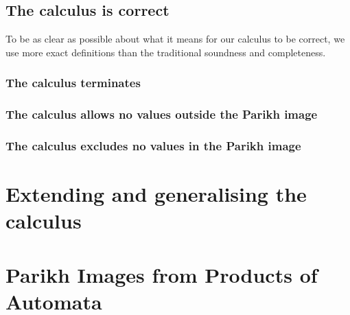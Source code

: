 \documentclass[acmsmall,review,anonymous]{acmart}\settopmatter{printfolios=true,printccs=false,printacmref=true}
\theoremstyle{definition}
\newtheorem{definition}{Definition}[section]
\begin{document}
\subsection{The calculus is correct}

To be as clear as possible about what it means for our calculus to be correct,
we use more exact definitions than the traditional soundness and completeness.

\subsubsection{The calculus terminates}
\subsubsection{The calculus allows no values outside the Parikh image}
\subsubsection{The calculus excludes no values in the Parikh image}

\section{Extending and generalising the calculus}

\section{Parikh Images from Products of Automata}

\end{document}
